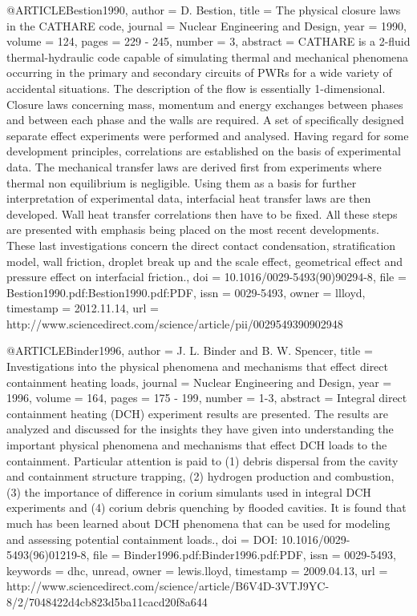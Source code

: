 @ARTICLE{Bestion1990,
  author = {D. Bestion},
  title = {The physical closure laws in the CATHARE code},
  journal = {Nuclear Engineering and Design},
  year = {1990},
  volume = {124},
  pages = {229 - 245},
  number = {3},
  abstract = {CATHARE is a 2-fluid thermal-hydraulic code capable of simulating
	thermal and mechanical phenomena occurring in the primary and secondary
	circuits of PWRs for a wide variety of accidental situations. The
	description of the flow is essentially 1-dimensional. Closure laws
	concerning mass, momentum and energy exchanges between phases and
	between each phase and the walls are required. A set of specifically
	designed separate effect experiments were performed and analysed.
	Having regard for some development principles, correlations are established
	on the basis of experimental data. The mechanical transfer laws are
	derived first from experiments where thermal non equilibrium is negligible.
	Using them as a basis for further interpretation of experimental
	data, interfacial heat transfer laws are then developed. Wall heat
	transfer correlations then have to be fixed. All these steps are
	presented with emphasis being placed on the most recent developments.
	These last investigations concern the direct contact condensation,
	stratification model, wall friction, droplet break up and the scale
	effect, geometrical effect and pressure effect on interfacial friction.},
  doi = {10.1016/0029-5493(90)90294-8},
  file = {Bestion1990.pdf:Bestion1990.pdf:PDF},
  issn = {0029-5493},
  owner = {llloyd},
  timestamp = {2012.11.14},
  url = {http://www.sciencedirect.com/science/article/pii/0029549390902948}
}

@ARTICLE{Binder1996,
  author = {J. L. Binder and B. W. Spencer},
  title = {Investigations into the physical phenomena and mechanisms that effect
	direct containment heating loads},
  journal = {Nuclear Engineering and Design},
  year = {1996},
  volume = {164},
  pages = {175 - 199},
  number = {1-3},
  abstract = {Integral direct containment heating (DCH) experiment results are presented.
	The results are analyzed and discussed for the insights they have
	given into understanding the important physical phenomena and mechanisms
	that effect DCH loads to the containment. Particular attention is
	paid to (1) debris dispersal from the cavity and containment structure
	trapping, (2) hydrogen production and combustion, (3) the importance
	of difference in corium simulants used in integral DCH experiments
	and (4) corium debris quenching by flooded cavities. It is found
	that much has been learned about DCH phenomena that can be used for
	modeling and assessing potential containment loads.},
  doi = {DOI: 10.1016/0029-5493(96)01219-8},
  file = {Binder1996.pdf:Binder1996.pdf:PDF},
  issn = {0029-5493},
  keywords = {dhc, unread},
  owner = {lewis.lloyd},
  timestamp = {2009.04.13},
  url = {http://www.sciencedirect.com/science/article/B6V4D-3VTJ9YC-8/2/7048422d4cb823d5ba11cacd20f8a644}
}

